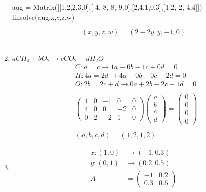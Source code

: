 \documentclass[11pt]{article}
\begin{document}
\begin{preview}
\begin{enumerate}
\begin{python}
                        aug = Matrix([[1,2,2,3,0],[-4,-8,-8,-9,0],[2,4,1,0,3],[1,2,-2,-4,4]])
                        linsolve(aug,x,y,z,w)
                  \end{python}
                  $$(x,y,z,w) = (2-2y,y, -1, 0)$$ \\
                  \setcounter{enumi}{6}
            \item $aCH_4 + bO_2 \rightarrow cCO_2 + dH_2O$
                  \begin{align*}
                         & C : a = c  \rightarrow 1a + 0b - 1c + 0d = 0                                    \\
                         & H : 4a = 2d  \rightarrow 4a + 0b + 0c - 2d = 0                                  \\
                         & O : 2b = 2c + d  \rightarrow 0a + 2b - 2c + 1d = 0                              \\\\
                         & \begin{pmatrix}1&0&-1&0&0\\ 4&0&0&-2&0\\ 0&2&-2&1&0 \end{pmatrix}\begin{pmatrix}
                              a \\b\\c\\d
                        \end{pmatrix}  = \begin{pmatrix}
                              0 \\0\\0\\0
                        \end{pmatrix} \\\\
                         & (a,b,c,d) = (1,2,1,2)
                  \end{align*}
            \item \begin{align*}
                        x : (1,0) & \rightarrow (-1,0.3)        \\
                        y : (0,1) & \rightarrow (0.2,0.5)       \\
                        A         & = \begin{pmatrix}-1&0.2\\ 0.3&0.5\end{pmatrix}
                  \end{align*}

\end{enumerate}
\end{preview}
\end{document}
